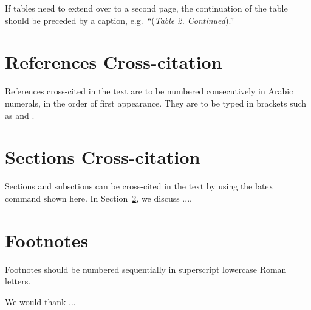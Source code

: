 \documentclass[twoside]{article}
\begin{document}
If tables need to extend over to a second page, the continuation
of the table should be preceded by a caption, e.g.~``({\it Table
2. Continued}).''

\section{References Cross-citation}
\noindent
References cross-cited in the text are to be numbered consecutively in
Arabic numerals, in the order of first appearance. They are to
be typed in brackets such as \cite{first}  and \cite{cal, niel, mar}.

\section{Sections Cross-citation}\label{sec:abc}
\noindent
Sections and subsctions can be cross-cited in the text by using the latex command
shown here. In Section~\ref{sec:abc}, we discuss ....

\section{Footnotes}
\noindent
Footnotes should be numbered sequentially in superscript
lowercase Roman letters.

\noindent
We would thank ...
\end{document}
